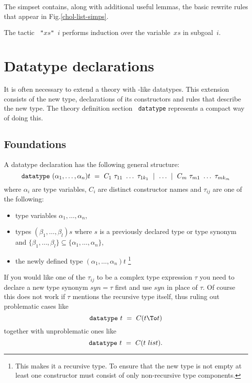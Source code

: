 The simpset  contains, along with additional useful lemmas,
the basic rewrite rules that appear in Fig.\ts\ref{chol-list-simps}.

The tactic {\tt{} "$xs$" $i$} performs induction over the
variable~$xs$ in subgoal~$i$.


\section{Datatype declarations}

\underscoreon

It is often necessary to extend a theory with \ML-like datatypes.  This
extension consists of the new type, declarations of its constructors and
rules that describe the new type. The theory definition section {\tt
  datatype} represents a compact way of doing this.


\subsection{Foundations}

A datatype declaration has the following general structure:
\[ \mbox{\tt datatype}~ (\alpha_1,\dots,\alpha_n)t ~=~
      C_1~\tau_{11}~\dots~\tau_{1k_1} ~\mid~ \dots ~\mid~
      C_m~\tau_{m1}~\dots~\tau_{mk_m} 
\]
where $\alpha_i$ are type variables, $C_i$ are distinct constructor names and
$\tau_{ij}$ are one of the following:
\begin{itemize}
\item type variables $\alpha_1,\dots,\alpha_n$,
\item types $(\beta_1,\dots,\beta_l)s$ where $s$ is a previously declared
  type or type synonym and $\{\beta_1,\dots,\beta_l\} \subseteq
  \{\alpha_1,\dots,\alpha_n\}$,
\item the newly defined type $(\alpha_1,\dots,\alpha_n)t$ \footnote{This
    makes it a recursive type. To ensure that the new type is not empty at
    least one constructor must consist of only non-recursive type
    components.}
\end{itemize}
If you would like one of the $\tau_{ij}$ to be a complex type expression
$\tau$ you need to declare a new type synonym $syn = \tau$ first and use
$syn$ in place of $\tau$. Of course this does not work if $\tau$ mentions the
recursive type itself, thus ruling out problematic cases like \[ \mbox{\tt
  datatype}~ t ~=~ C(t \To t) \] together with unproblematic ones like \[
\mbox{\tt datatype}~ t ~=~ C(t~list). \]

